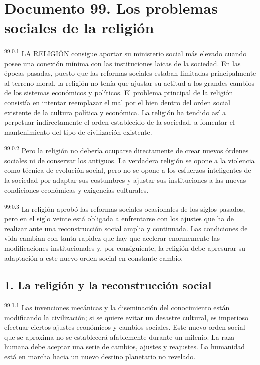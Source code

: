 \documentclass[twoside, 11pt]{book}
\begin{document}
\pagestyle{main}
\renewcommand{\makeheadrule}{\rule[-.6\baselineskip]{\linewidth}{.4pt}}



\chapter{Documento 99. Los problemas sociales de la religión}
\par
\textsuperscript{99:0.1} LA RELIGIÓN consigue aportar su ministerio social más elevado cuando posee una conexión mínima con las instituciones laicas de la sociedad. En las épocas pasadas, puesto que las reformas sociales estaban limitadas principalmente al terreno moral, la religión no tenía que ajustar su actitud a los grandes cambios de los sistemas económicos y políticos. El problema principal de la religión consistía en intentar reemplazar el mal por el bien dentro del orden social existente de la cultura política y económica. La religión ha tendido así a perpetuar indirectamente el orden establecido de la sociedad, a fomentar el mantenimiento del tipo de civilización existente.

\par
\textsuperscript{99:0.2} Pero la religión no debería ocuparse directamente de crear nuevos órdenes sociales ni de conservar los antiguos. La verdadera religión se opone a la violencia como técnica de evolución social, pero no se opone a los esfuerzos inteligentes de la sociedad por adaptar sus costumbres y ajustar sus instituciones a las nuevas condiciones económicas y exigencias culturales.

\par
\textsuperscript{99:0.3} La religión aprobó las reformas sociales ocasionales de los siglos pasados, pero en el siglo veinte está obligada a enfrentarse con los ajustes que ha de realizar ante una reconstrucción social amplia y continuada. Las condiciones de vida cambian con tanta rapidez que hay que acelerar enormemente las modificaciones institucionales y, por consiguiente, la religión debe apresurar su adaptación a este nuevo orden social en constante cambio.

\section*{1. La religión y la reconstrucción social}
\par
\textsuperscript{99:1.1} Las invenciones mecánicas y la diseminación del conocimiento están modificando la civilización; si se quiere evitar un desastre cultural, es imperioso efectuar ciertos ajustes económicos y cambios sociales. Este nuevo orden social que se aproxima no se establecerá afablemente durante un milenio. La raza humana debe aceptar una serie de cambios, ajustes y reajustes. La humanidad está en marcha hacia un nuevo destino planetario no revelado.
\end{document}
